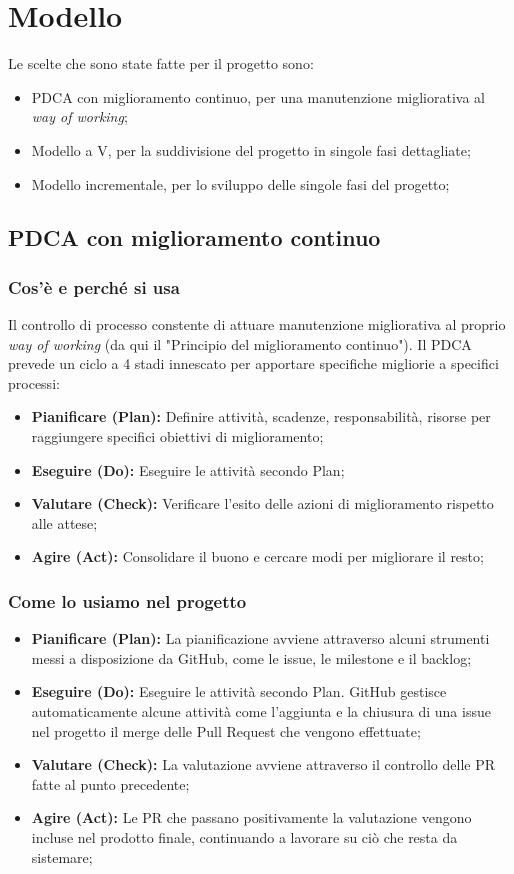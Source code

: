 \chapter{Modello}
Le scelte che sono state fatte per il progetto sono:
\begin{itemize}
    \item PDCA con miglioramento continuo, per una manutenzione migliorativa al {\it{way of working}};
    \item Modello a V, per la suddivisione del progetto in singole fasi dettagliate;
    \item Modello incrementale, per lo sviluppo delle singole fasi del progetto;
\end{itemize}

\section{PDCA con miglioramento continuo}
\subsection{Cos'è e perché si usa}
Il controllo di processo constente di attuare manutenzione migliorativa al proprio {\it{way of working}} (da qui il "Principio del miglioramento continuo"). Il PDCA prevede un ciclo a 4 stadi innescato per apportare specifiche migliorie a specifici processi:
\begin{itemize}
    \item \textbf{Pianificare (Plan):} Definire attività, scadenze, responsabilità, risorse per raggiungere
    specifici obiettivi di miglioramento; 
    \item \textbf{Eseguire (Do):} Eseguire le attività secondo Plan; 
    \item \textbf{Valutare (Check):} Verificare l’esito delle azioni di miglioramento rispetto alle attese;
    \item \textbf{Agire (Act):} Consolidare il buono e cercare modi per migliorare il resto;
\end{itemize}
\subsection{Come lo usiamo nel progetto}
\begin{itemize}
    \item \textbf{Pianificare (Plan):} La pianificazione avviene attraverso alcuni strumenti messi a disposizione da GitHub, come le issue, le milestone e il backlog; 
    \item \textbf{Eseguire (Do):} Eseguire le attività secondo Plan. GitHub gestisce automaticamente alcune attività come l'aggiunta e la chiusura di una issue nel progetto il merge delle Pull Request che vengono effettuate; 
    \item \textbf{Valutare (Check):} La valutazione avviene attraverso il controllo delle PR fatte al punto precedente;
    \item \textbf{Agire (Act):} Le PR che passano positivamente la valutazione vengono incluse nel prodotto finale, continuando a lavorare su ciò che resta da sistemare;
\end{itemize}

